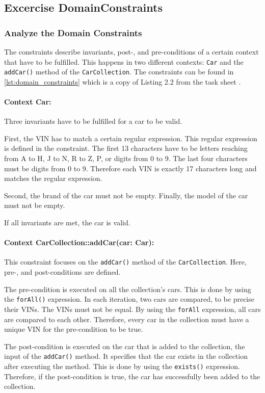 \subsection{Excercise DomainConstraints}
\subsubsection*{Analyze the Domain Constraints}
The constraints describe invariants, post-, and pre-conditions of a certain context that have to be fulfilled.
This happens in two different contexts: \texttt{Car} and the \texttt{addCar()} method of the \texttt{CarCollection}.
The constraints can be found in \autoref*{lst:domain_constraints} which is a copy of Listing 2.2 from the task sheet \cite{CM-T-DMC}.

\paragraph*{Context Car:}
Three invariants have to be fulfilled for a car to be valid.

First, the VIN has to match a certain regular expression.
This regular expression is defined in the constraint.
The first 13 characters have to be letters reaching from A to H, J to N, R to Z, P, or digits from 0 to 9.
The last four characters must be digits from 0 to 9.
Therefore each VIN is exactly 17 characters long and matches the regular expression.

Second, the brand of the car must not be empty.
Finally, the model of the car must not be empty.

If all invariants are met, the car is valid.

\paragraph*{Context CarCollection::addCar(car: Car):}
This constraint focuses on the \texttt{addCar()} method of the \texttt{CarCollection}.
Here, pre-, and post-conditions are defined.

The pre-condition is executed on all the collection's cars.
This is done by using the \texttt{forAll()} expression.
In each iteration, two cars are compared, to be precise their VINs.
The VINs must not be equal.
By using the \texttt{forAll} expression, all cars are compared to each other.
Therefore, every car in the collection must have a unique VIN for the pre-condition to be true.

The post-condition is executed on the car that is added to the collection, the input of the \texttt{addCar()} method.
It specifies that the car exists in the collection after executing the method.
This is done by using the \texttt{exists()} expression.
Therefore, if the post-condition is true, the car has successfully been added to the collection.

